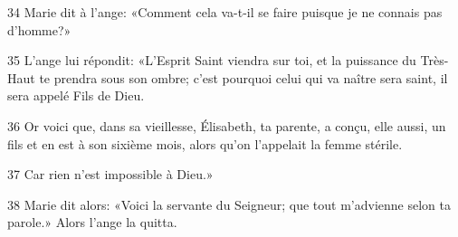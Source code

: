 
34 Marie dit à l’ange: «Comment cela va-t-il se faire puisque je ne connais pas d’homme?»

35 L’ange lui répondit: «L’Esprit Saint viendra sur toi, et la puissance du Très-Haut te prendra sous son ombre; c’est pourquoi celui qui va naître sera saint, il sera appelé Fils de Dieu.

36 Or voici que, dans sa vieillesse, Élisabeth, ta parente, a conçu, elle aussi, un fils et en est à son sixième mois, alors qu’on l’appelait la femme stérile.

37 Car rien n’est impossible à Dieu.»

38 Marie dit alors: «Voici la servante du Seigneur; que tout m’advienne selon ta parole.» Alors l’ange la quitta.